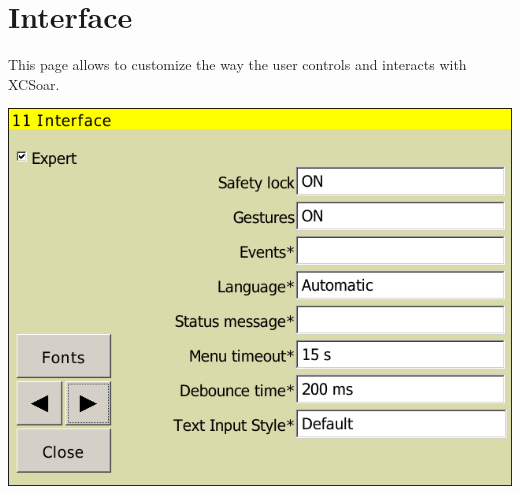 \documentclass[a4paper,12pt]{refrep}
\begin{document}

\clearpage
\section{Interface}\label{sec:interface}

This page allows to customize the way the user controls and interacts with
XCSoar.

\begin{center}
\includegraphics[angle=0,width=\linewidth,keepaspectratio='true']{figures/config-interface.png}
\end{center}
\end{document}
